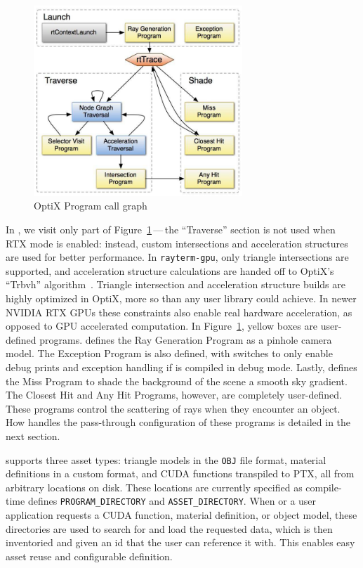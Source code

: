 \vspace{0.3em}
\begin{figure}[htb]
  \centering
  \includegraphics[width=0.7\textwidth]{resources/optix_trace}
  \caption{OptiX Program call graph}
\label{fig:rayterm-gpu_optix_trace}
\end{figure}

In \name{}, we visit only part of Figure~\ref{fig:rayterm-gpu_optix_trace}\,---\,the ``Traverse'' section is not used when RTX mode is enabled: instead, custom intersections and acceleration structures are used for better performance.
In \texttt{rayterm-gpu}, only triangle intersections are supported, and acceleration structure calculations are handed off to OptiX's ``Trbvh'' algorithm~\cite{karras2013fast}.
Triangle intersection and acceleration structure builds are highly optimized in OptiX, more so than any user library could achieve.
In newer NVIDIA RTX GPUs these constraints also enable real hardware acceleration, as opposed to GPU accelerated computation.
In Figure~\ref{fig:rayterm-gpu_optix_trace}, yellow boxes are user-defined programs.
 \name{} defines the Ray Generation Program as a pinhole camera model.
The Exception Program is also defined, with switches to only enable debug prints and exception handling if \name{} is compiled in debug mode.
Lastly, \name{} defines the Miss Program to shade the background of the scene a smooth sky gradient.
The Closest Hit and Any Hit Programs, however, are completely user-defined.
These programs control the scattering of rays when they encounter an object.
How \name{} handles the pass-through configuration of these programs is detailed in the next section.

\name{} supports three asset types: triangle models in the \texttt{OBJ} file format, material definitions in a custom format, and CUDA functions transpiled to PTX, all from arbitrary locations on disk.
These locations are currently specified as compile-time defines \texttt{PROGRAM\_DIRECTORY} and \texttt{ASSET\_DIRECTORY}.
When \name{} or a user application requests a CUDA function, material definition, or object model, these directories are used to search for and load the requested data, which is then inventoried and given an id that the user can reference it with.
This enables easy asset reuse and configurable definition.


